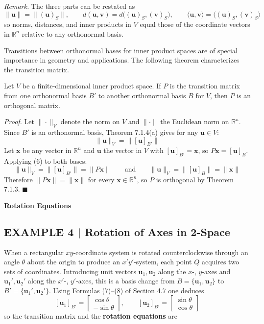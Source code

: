 \documentclass{article}
\newcommand{\redheading}[1]{{\vspace{2mm}\noindent\Large\bfseries\color{red!55!black} #1\par}\vspace{2mm}}
\theoremstyle{mystyle}
\begin{document}
\textit{Remark.} The three parts can be restated as
\[
  \|\mathbf{u}\| = \|(\mathbf{u})_S\|, \qquad
  d(\mathbf{u},\mathbf{v}) = d\!\bigl((\mathbf{u})_S,(\mathbf{v})_S\bigr), \qquad
  \langle\mathbf{u},\mathbf{v}\rangle = \langle(\mathbf{u})_S,(\mathbf{v})_S\rangle
\]
so norms, distances, and inner products in $V$ equal those of the coordinate vectors
in $\mathbb{R}^n$ relative to any orthonormal basis.

Transitions between orthonormal bases for inner product spaces are of special importance
in geometry and applications. The following theorem characterizes the transition matrix.

\begin{tcolorbox}[colback=red!4, colframe=red!60!black,
  title={\textbf{Theorem 7.1.5}}, boxrule=0.5mm, arc=3mm]
Let $V$ be a finite-dimensional inner product space. If $P$ is the transition matrix
from one orthonormal basis $B'$ to another orthonormal basis $B$ for $V$, then $P$ is
an orthogonal matrix.
\end{tcolorbox}

\textit{Proof.} Let $\|\cdot\|_V$ denote the norm on $V$ and $\|\cdot\|$ the Euclidean norm on $\mathbb{R}^n$. Since $B'$ is an orthonormal basis, Theorem 7.1.4(a) gives for any $\mathbf{u}\in V$:
\[
  \|\mathbf{u}\|_V = \|[\mathbf{u}]_{B'}\| \tag{6}
\]
Let $\mathbf{x}$ be any vector in $\mathbb{R}^n$ and $\mathbf{u}$ the vector in $V$ with $[\mathbf{u}]_{B'} = \mathbf{x}$, so $P\mathbf{x} = [\mathbf{u}]_B$. Applying (6) to both bases:
\[
  \|\mathbf{u}\|_V = \|[\mathbf{u}]_{B'}\| = \|P\mathbf{x}\| \qquad\text{and}\qquad
  \|\mathbf{u}\|_V = \|[\mathbf{u}]_B\| = \|\mathbf{x}\|
\]
Therefore $\|P\mathbf{x}\| = \|\mathbf{x}\|$ for every $\mathbf{x}\in\mathbb{R}^n$, so $P$ is orthogonal by Theorem 7.1.3. $\blacksquare$

\redheading{Rotation Equations}

\subsection*{EXAMPLE 4 | Rotation of Axes in 2-Space}

When a rectangular $xy$-coordinate system is rotated counterclockwise through an angle
$\theta$ about the origin to produce an $x'y'$-system, each point $Q$ acquires two
sets of coordinates. Introducing unit vectors $\mathbf{u}_1, \mathbf{u}_2$ along the
$x$-, $y$-axes and $\mathbf{u}_1', \mathbf{u}_2'$ along the $x'$-, $y'$-axes, this is a
basis change from $B=\{\mathbf{u}_1,\mathbf{u}_2\}$ to $B'=\{\mathbf{u}_1',\mathbf{u}_2'\}$.
Using Formulas (7)--(8) of Section 4.7 one deduces
\[
  [\mathbf{u}_1]_{B'} = \begin{bmatrix}\cos\theta\\-\sin\theta\end{bmatrix}, \qquad
  [\mathbf{u}_2]_{B'} = \begin{bmatrix}\sin\theta\\\cos\theta\end{bmatrix}
\]
so the transition matrix and the \textbf{rotation equations} are
\end{document}
